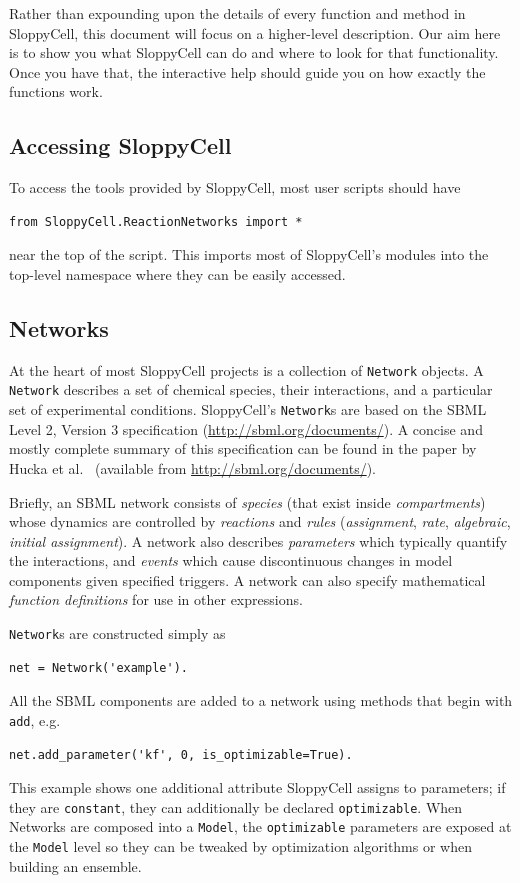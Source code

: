 \documentclass[12pt]{article}
\makeatletter
\newcommand{\py}[1]{\lstinline[language=Python, showstringspaces=False]@#1@}
\makeatother
\begin{document}
Rather than expounding upon the details of every function and method in SloppyCell, this document will focus on a higher-level description.
Our aim here is to show you what SloppyCell can do and where to look for that functionality.
Once you have that, the interactive help should guide you on how exactly the functions work.

\subsection{Accessing SloppyCell}
To access the tools provided by SloppyCell, most user scripts should have
\begin{lstlisting}
from SloppyCell.ReactionNetworks import *
\end{lstlisting}
near the top of the script.
This imports most of SloppyCell's modules into the top-level namespace where they can be easily accessed.

\subsection{Networks}
At the heart of most SloppyCell projects is a collection of \py{Network} objects.
A \py{Network} describes a set of chemical species, their interactions, and a particular set of experimental conditions.
SloppyCell's \py{Network}s are based on the SBML Level 2, Version 3 specification (\url{http://sbml.org/documents/}).
A concise and mostly complete summary of this specification can be found in the paper by Hucka et al.~\cite{bib:Hucka2003} (available from \url{http://sbml.org/documents/}).

Briefly, an SBML network consists of \emph{species} (that exist inside \emph{compartments}) whose dynamics are controlled by \emph{reactions} and \emph{rules} (\emph{assignment}, \emph{rate}, \emph{algebraic}, \emph{initial assignment}).
A network also describes \emph{parameters} which typically quantify the interactions, and \emph{events} which cause discontinuous changes in model components given specified triggers.
A network can also specify mathematical \emph{function definitions} for use in other expressions.

\py{Network}s are constructed simply as
\begin{lstlisting}
net = Network('example').
\end{lstlisting}
All the SBML components are added to a network using methods that begin with \py{add}, e.g.
\begin{lstlisting}
net.add_parameter('kf', 0, is_optimizable=True).
\end{lstlisting}
This example shows one additional attribute SloppyCell assigns to parameters; if they are \py{constant}, they can additionally be declared \py{optimizable}.
When Networks are composed into a \py{Model}, the \py{optimizable} parameters are exposed at the \py{Model} level so they can be tweaked by optimization algorithms or when building an ensemble.
\end{document}
